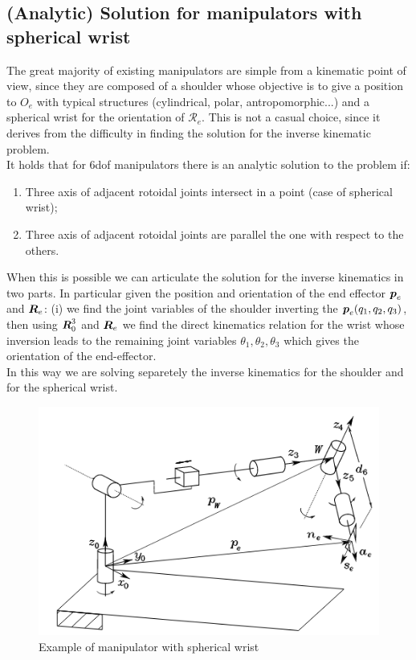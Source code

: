 \subsection{(Analytic) Solution for manipulators with spherical wrist}
The great majority of existing manipulators are simple from a kinematic point of view, since they are composed of a shoulder whose objective is to give a position to $O_e$ with typical structures (cylindrical, polar, antropomorphic...) and a spherical wrist for the orientation of $\mathcal{R}_e$. This is not a casual choice, since it derives from the difficulty in finding the solution for the inverse kinematic problem.\\
It holds that for 6dof manipulators there is an analytic solution to  the problem if:
\begin{enumerate}
    \itemsep-0.3em 
    \item Three axis of adjacent rotoidal joints intersect in a point (case of spherical wrist); 
    \item Three axis of adjacent rotoidal joints are parallel the one with respect to the others. 
\end{enumerate}

When this is possible we can articulate the solution for the inverse kinematics in two parts. In particular given the position and orientation of the end effector $\boldsymbol{p}_e$ and $\boldsymbol{R}_e$: (i) we find the joint variables of the shoulder inverting the $\boldsymbol{p}_e(q_1,q_2,q_3)$, then using $\boldsymbol{R}_0^3$ and $\boldsymbol{R}_e$ we find the direct kinematics relation for the wrist whose inversion leads to the remaining joint variables $\theta_1, \theta_2, \theta_3$ which gives the orientation of the end-effector.\\
In this way we are solving separetely the inverse kinematics for the shoulder and for the spherical wrist.

\begin{figure}
    \centering
    \includegraphics[scale=0.8]{img/man_spherical_wrist.png}
    \caption{Example of manipulator with spherical wrist}
\end{figure}


